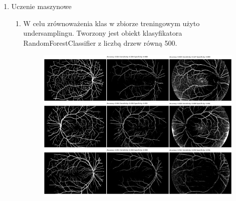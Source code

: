 \documentclass{article}
\begin{document}
\begin{enumerate}
\begin{enumerate}
              \item Uczenie maszynowe
                    \begin{enumerate}
                        \item W celu zrównoważenia klas w zbiorze treningowym użyto undersamplingu. Tworzony
                              jest obiekt klasyfikatora RandomForestClassifier z liczbą drzew równą 500.\\
                              \begin{center}
                                  \begin{figure}[h]
                                      \centering
                                      \begin{minipage}{0.91\textwidth}
                                          \centering
                                          \includegraphics[width=0.91\linewidth]{../res/predicted-images.png}
                                      \end{minipage}
                                  \end{figure}
                              \end{center}
                    \end{enumerate}
          \end{enumerate}
\end{enumerate}
\end{document}
